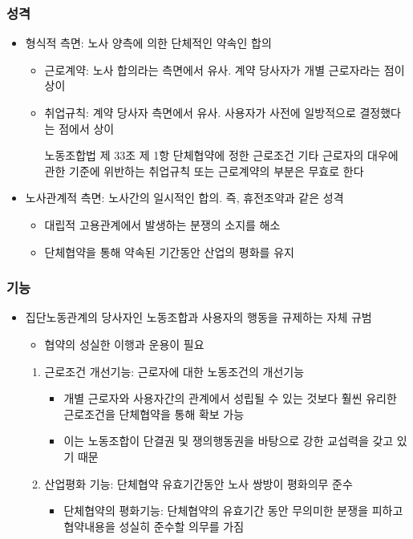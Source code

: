 \documentclass[aspectratio=169,xcolor=dvipsnames,handout]{beamer}
\begin{document}
\begin{frame}
    \frametitle{성격}
    \begin{itemize}[<+->]
    \item 형식적 측면: 노사 양측에 의한 단체적인 약속인 합의
        \begin{itemize}[<+->]
            \item 근로계약: 노사 합의라는 측면에서 유사. 계약 당사자가 개별 근로자라는 점이 상이 
            \item 취업규칙: 계약 당사자 측면에서 유사. 사용자가 사전에 일방적으로 결정했다는 점에서 상이
                \begin{exampleblock}{노동조합법 제 33조 제 1항}
                    단체협약에 정한 근로조건 기타 근로자의 대우에 관한 기준에 위반하는 취업규칙 또는 근로계약의 부분은 무효로 한다
                \end{exampleblock}
        \end{itemize}
    \item 노사관계적 측면: 노사간의 일시적인 합의. 즉, 휴전조약과 같은 성격
        \begin{itemize}[<+->]
            \item 대립적 고용관계에서 발생하는 분쟁의 소지를 해소
            \item 단체협약을 통해 약속된 기간동안 산업의 평화를 유지
        \end{itemize}
    \end{itemize}
\end{frame}

\begin{frame}
    \frametitle{기능}
    \begin{itemize}[<+->]
        \item 집단노동관계의 당사자인 노동조합과 사용자의 행동을 규제하는 자체 규범
        \begin{itemize}[<+->]
            \item 협약의 성실한 이행과 운용이 필요
        \end{itemize}
        \begin{enumerate}[<+->]
            \item 근로조건 개선기능: 근로자에 대한 노동조건의 개선기능
            \begin{itemize}[<+->]
                \item 개별 근로자와 사용자간의 관계에서 성립될 수 있는 것보다 훨씬 유리한 근로조건을 단체협약을 통해 확보 가능
                \item 이는 노동조합이 단결권 및 쟁의행동권을 바탕으로 강한 교섭력을 갖고 있기 때문
            \end{itemize}
            \item 산업평화 기능: 단체협약 유효기간동안 노사 쌍방이 평화의무 준수
            \begin{itemize}[<+->]
                \item 단체협약의 평화기능: 단체협약의 유효기간 동안 무의미한 분쟁을 피하고 협약내용을 성실히 준수할 의무를 가짐
            \end{itemize}
        \end{enumerate}
    \end{itemize}
\end{frame}
\end{document}
